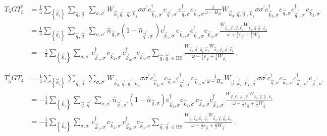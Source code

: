 \documentclass{revtex4-2}
\begin{document}
\begin{equation}\begin{aligned}
	T_5 G T_5^\dagger &= \frac{1}{4}\sum_{\left\{ \vec k_i \right\} }\sum_{\vec q,\vec q^\prime}\sum_{\sigma,\sigma^\prime} W_{\vec k_1 \vec q^\prime, \vec q, \vec k_4} \sigma\sigma^\prime c^\dagger_{\vec k_1,\sigma^\prime}c_{\vec q^\prime,\sigma^\prime}c^\dagger_{\vec q,\sigma}c_{\vec k_4,\sigma} \frac{1}{\omega - H_D}W_{\vec k_3, \vec q, \vec q^\prime, \vec k_2} \sigma\sigma^\prime c^\dagger_{\vec k_3,\sigma}c_{\vec q,\sigma}c^\dagger_{\vec q^\prime,\sigma^\prime}c_{\vec k_2,\sigma^\prime}\\
		  &= \frac{1}{4}\sum_{\left\{ \vec k_i \right\} }\sum_{\vec q,\vec q^\prime}\sum_{\sigma,\sigma^\prime} \hat n_{\vec q,\sigma} \left(1 - \hat n_{\vec q^\prime,\sigma^\prime}\right) c^\dagger_{\vec k_1,\sigma^\prime}c_{\vec k_4,\sigma}c^\dagger_{\vec k_3,\sigma}c_{\vec k_2,\sigma^\prime} \frac{W_{\vec k_1, \vec q^\prime, \vec q,\vec k_4} W_{\vec k_3, \vec q, \vec q^\prime, \vec k_2}}{\omega + \frac{1}{2}\varepsilon_{\vec q}  + \frac{1}{2}W_{\vec q}}  \\
		  &= -\frac{1}{4}\sum_{\left\{ \vec k_i \right\} }\sum_{\sigma,\sigma^\prime} c^\dagger_{\vec k_1,\sigma^\prime} c_{\vec k_2,\sigma^\prime} c^\dagger_{\vec k_3,\sigma} c_{\vec k_4,\sigma} \sum_{\vec q, \vec q^\prime \in \text{HS}}\frac{W_{\vec k_1, \vec q^\prime, \vec q_t,\vec k_4} W_{\vec k_3, \vec q_t, \vec q^\prime, \vec k_2}}{\omega - \frac{1}{2}\varepsilon_{\vec q}  + \frac{1}{2}W_{\vec q_t}}~.
\end{aligned}\end{equation}

\begin{equation}\begin{aligned}
	T_5^\dagger G T_4 &= \frac{1}{4}\sum_{\left\{ \vec k_i \right\} }\sum_{\vec q,\vec q^\prime}\sum_{\sigma,\sigma^\prime} W_{\vec k_3, \vec q, \vec q^\prime, \vec k_2} \sigma\sigma^\prime c^\dagger_{\vec k_3,\sigma}c_{\vec q,\sigma}c^\dagger_{\vec q^\prime,\sigma^\prime}c_{\vec k_2,\sigma^\prime} \frac{1}{\omega - H_D}W_{\vec q,\vec k_4, \vec k_1, \vec q^\prime} \sigma\sigma^\prime c^\dagger_{\vec q,\sigma}c_{\vec k_4,\sigma}c^\dagger_{\vec k_1,\sigma^\prime}c_{\vec q^\prime,\sigma^\prime}\\
		  &= -\frac{1}{4}\sum_{\left\{ \vec k_i \right\} }\sum_{\vec q,\vec q^\prime}\sum_{\sigma,\sigma^\prime} \hat n_{\vec q^\prime,\sigma^\prime} \left(1 - \hat n_{\vec q,\sigma}\right) c^\dagger_{\vec k_3,\sigma}c_{\vec k_2,\sigma^\prime}c_{\vec k_4,\sigma} c^\dagger_{\vec k_1,\sigma^\prime} \frac{W_{\vec q,\vec k_4, \vec k_1, \vec q^\prime} W_{\vec k_3, \vec q, \vec q^\prime, \vec k_2}}{\omega - \frac{1}{2}\varepsilon_{\vec q}  + \frac{1}{2}W_{\vec q}}  \\
		  &= -\frac{1}{4}\sum_{\left\{ \vec k_i \right\}}\sum_{\sigma,\sigma^\prime} c^\dagger_{\vec k_1,\sigma^\prime}c_{\vec k_2,\sigma^\prime}c^\dagger_{\vec k_3,\sigma} c_{\vec k_4,\sigma} \sum_{\vec q, \vec q^\prime \in \text{HS}}\frac{W_{\vec q,\vec k_4, \vec k_1, \vec q_t^\prime} W_{\vec k_3, \vec q, \vec q_t^\prime, \vec k_2}}{\omega - \frac{1}{2}\varepsilon_{\vec q}  + \frac{1}{2}W_{\vec q}}~.
\end{aligned}\end{equation}
\end{document}

